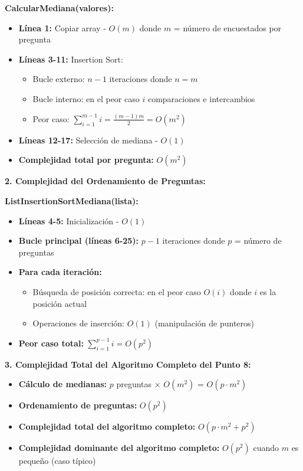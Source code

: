 \documentclass[11pt,a4paper]{article}
\begin{document}
\textbf{CalcularMediana(valores):}
\begin{itemize}[label=\textbullet]
\item \textbf{Línea 1:} Copiar array - $O(m)$ donde $m$ = número de encuestados por pregunta
\item \textbf{Líneas 3-11:} Insertion Sort:
  \begin{itemize}
  \item Bucle externo: $n-1$ iteraciones donde $n = m$
  \item Bucle interno: en el peor caso $i$ comparaciones e intercambios
  \item Peor caso: $\sum_{i=1}^{m-1} i = \frac{(m-1)m}{2} = O(m^2)$
  \end{itemize}
\item \textbf{Líneas 12-17:} Selección de mediana - $O(1)$
\item \textbf{Complejidad total por pregunta:} $O(m^2)$
\end{itemize}

\textbf{2. Complejidad del Ordenamiento de Preguntas:}

\textbf{ListInsertionSortMediana(lista):}
\begin{itemize}[label=\textbullet]
\item \textbf{Líneas 4-5:} Inicialización - $O(1)$
\item \textbf{Bucle principal (líneas 6-25):} $p-1$ iteraciones donde $p$ = número de preguntas
\item \textbf{Para cada iteración:}
  \begin{itemize}
  \item Búsqueda de posición correcta: en el peor caso $O(i)$ donde $i$ es la posición actual
  \item Operaciones de inserción: $O(1)$ (manipulación de punteros)
  \end{itemize}
\item \textbf{Peor caso total:} $\sum_{i=1}^{p-1} i = O(p^2)$
\end{itemize}

\textbf{3. Complejidad Total del Algoritmo Completo del Punto 8:}

\begin{itemize}[label=\textbullet]
\item \textbf{Cálculo de medianas:} $p$ preguntas × $O(m^2)$ = $O(p \cdot m^2)$
\item \textbf{Ordenamiento de preguntas:} $O(p^2)$
\item \textbf{Complejidad total del algoritmo completo:} $O(p \cdot m^2 + p^2)$
\item \textbf{Complejidad dominante del algoritmo completo:} $O(p^2)$ cuando $m$ es pequeño (caso típico)
\end{itemize}
\end{document}
